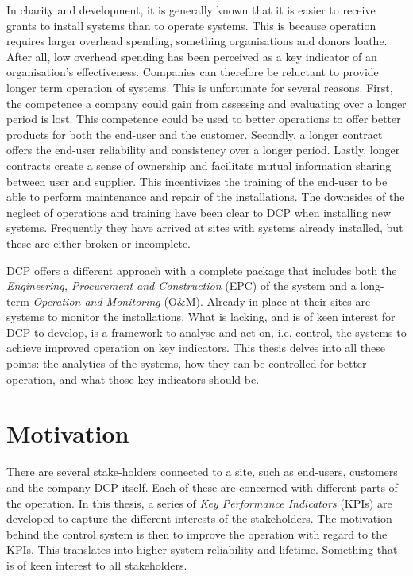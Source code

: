 In charity and development, it is generally known that it is easier to receive grants to install systems than to operate systems. This is because operation requires larger overhead spending, something organisations and donors loathe. After all, low overhead spending has been perceived as a key indicator of an organisation's effectiveness.\cite{Berrett2020-wi} Companies can therefore be reluctant to provide longer term operation of systems. This is unfortunate for several reasons. First, the competence a company could gain from assessing and evaluating over a longer period is lost. This competence could be used to better operations to offer better products for both the end-user and the customer. Secondly, a longer contract offers the end-user reliability and consistency over a longer period. Lastly, longer contracts create a sense of ownership and facilitate mutual information sharing between user and supplier. This incentivizes the training of the end-user to be able to perform maintenance and repair of the installations. The downsides of the neglect of operations and training have been clear to DCP when installing new systems. Frequently they have arrived at sites with systems already installed, but these are either broken or incomplete.

DCP offers a different approach with a complete package that includes both the \textit{Engineering, Procurement and Construction} (EPC) of the system and a long-term \textit{Operation and Monitoring} (O\&M). Already in place at their sites are systems to monitor the installations. What is lacking, and is of keen interest for DCP to develop, is a framework to analyse and act on, i.e. control, the systems to achieve improved operation on key indicators. This thesis delves into all these points: the analytics of the systems, how they can be controlled for better operation, and what those key indicators should be. 

\section{Motivation}

There are several stake-holders connected to a site, such as end-users, customers and the company DCP itself. Each of these are concerned with different parts of the operation. In this thesis, a series of \textit{Key Performance Indicators} (KPIs) are developed to capture the different interests of the stakeholders. The motivation behind the control system is then to improve the operation with regard to the KPIs. This translates into higher system reliability and lifetime. Something that is of keen interest to all stakeholders.\\

